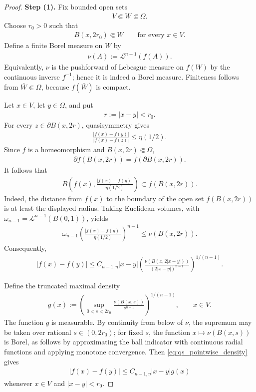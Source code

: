 \documentclass[11pt]{amsart}
\theoremstyle{plain}
\theoremstyle{plain}
\theoremstyle{plain}
\numberwithin{equation}{section}
\begin{document}
\begin{proof}
\textbf{Step (1).} 
Fix bounded open sets
\begin{align}
V\Subset W\Subset\Omega.\nonumber
\end{align}
Choose \(r_0>0\) such that
\begin{align}
B(x,2r_0)\Subset W
\qquad
\text{for every }x\in V.\nonumber
\end{align}
Define a finite Borel measure on \(W\) by
\begin{align}
\nu(A):=\mathcal L^{n-1}(f(A)).\nonumber
\end{align}
Equivalently, \(\nu\) is the pushforward of Lebesgue measure on
\(f(W)\) by the continuous inverse \(f^{-1}\); hence it is indeed a
Borel measure.  Finiteness follows from \(\overline W\Subset\Omega\),
because \(f(\overline W)\) is compact.

Let \(x\in V\), let \(y\in\Omega\), and put
\begin{align}
r:=|x-y|<r_0.\nonumber
\end{align}
For every \(z\in\partial B(x,2r)\), quasisymmetry gives
\begin{align}
\frac{|f(x)-f(y)|}{|f(x)-f(z)|}
\leq
\eta(1/2).\nonumber
\end{align}
Since \(f\) is a homeomorphism and \(\overline{B(x,2r)}\Subset\Omega\),
\begin{align}
\partial f(B(x,2r))=f(\partial B(x,2r)).\nonumber
\end{align}
It follows that
\begin{align}
B\!\left(
 f(x),\frac{|f(x)-f(y)|}{\eta(1/2)}
\right)
\subset f(B(x,2r)).\nonumber
\end{align}
Indeed, the distance from \(f(x)\) to the boundary of the open set
\(f(B(x,2r))\) is at least the displayed radius.  Taking Euclidean
volumes, with \(\omega_{n-1}=\mathcal L^{n-1}(B(0,1))\), yields
\begin{align}
\omega_{n-1}
\left(
\frac{|f(x)-f(y)|}{\eta(1/2)}
\right)^{n-1}
\leq
\nu(B(x,2r)).\nonumber
\end{align}
Consequently,
\begin{align}
|f(x)-f(y)|
\leq
C_{n-1,\eta}|x-y|
\left(
\frac{\nu(B(x,2|x-y|))}{(2|x-y|)^{n-1}}
\right)^{1/(n-1)}.
\label{eq:qs_pointwise_density}
\end{align}

Define the truncated maximal density
\begin{align}
g(x)
:=
\left(
\sup_{0<s<2r_0}
\frac{\nu(B(x,s))}{s^{n-1}}
\right)^{1/(n-1)},
\qquad x\in V.
\label{eq:g_def}
\end{align}
The function \(g\) is measurable.  By continuity from below of \(\nu\),
the supremum may be taken over rational \(s\in(0,2r_0)\); for fixed
\(s\), the function \(x\mapsto\nu(B(x,s))\) is Borel, as follows by
approximating the ball indicator with continuous radial functions and
applying monotone convergence.
Then \eqref{eq:qs_pointwise_density} gives
\begin{align}
|f(x)-f(y)|
\leq
C_{n-1,\eta}|x-y|g(x)
\label{eq:hajlasz_one_point}
\end{align}
whenever \(x\in V\) and \(|x-y|<r_0\).


\end{proof}
\end{document}
